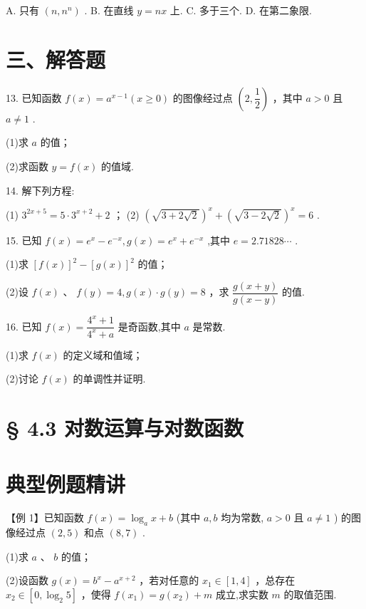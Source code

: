 A. 只有 $\left( {n,{n}^{n}}\right)$ . B. 在直线 $y = {nx}$ 上. C. 多于三个. D. 在第二象限.

\section*{三、解答题}

13. 已知函数 $f\left( x\right)  = {a}^{x - 1}\left( {x \geq  0}\right)$ 的图像经过点 $\left( {2,\dfrac{1}{2}}\right)$ ，其中 $a > 0$ 且 $a \neq  1$ .

(1)求 $a$ 的值；

(2)求函数 $y = f\left( x\right)$ 的值域.

14. 解下列方程:

(1) ${3}^{{2x} + 5} = 5 \cdot  {3}^{x + 2} + 2$ ； (2) ${\left( \sqrt{3 + 2\sqrt{2}}\right) }^{x} + {\left( \sqrt{3 - 2\sqrt{2}}\right) }^{x} = 6$ .

15. 已知 $f\left( x\right)  = {{e}}^{x} - {{e}}^{-x},g\left( x\right)  = {{e}}^{x} + {{e}}^{-x}$ ,其中 ${e} = {2.71828}\cdots$ .

(1)求 ${\left\lbrack  f\left( x\right) \right\rbrack  }^{2} - {\left\lbrack  g\left( x\right) \right\rbrack  }^{2}$ 的值；

(2)设 $f\left( x\right)$ 、 $f\left( y\right)  = 4,g\left( x\right)  \cdot  g\left( y\right)  = 8$ ，求 $\dfrac{g\left( {x + y}\right) }{g\left( {x - y}\right) }$ 的值.

16. 已知 $f\left( x\right)  = \dfrac{{4}^{x} + 1}{{4}^{x} + a}$ 是奇函数,其中 $a$ 是常数.

(1)求 $f\left( x\right)$ 的定义域和值域；

(2)讨论 $f\left( x\right)$ 的单调性并证明.

\section*{§ 4.3 对数运算与对数函数}

\section*{典型例题精讲}

【例 1】已知函数 $f\left( x\right)  = {\log }_{a}x + b$ (其中 $a,b$ 均为常数, $a > 0$ 且 $a \neq  1$ ) 的图像经过点 $\left( {2,5}\right)$ 和点 $\left( {8,7}\right)$ .

(1)求 $a$ 、 $b$ 的值；

(2)设函数 $g\left( x\right)  = {b}^{x} - {a}^{x + 2}$ ，若对任意的 ${x}_{1} \in  \left\lbrack  {1,4}\right\rbrack$ ，总存在 ${x}_{2} \in  \left\lbrack  {0,{\log }_{2}5}\right\rbrack$ ，使得 $f\left( {x}_{1}\right)  = g\left( {x}_{2}\right)  + m$ 成立,求实数 $m$ 的取值范围.

